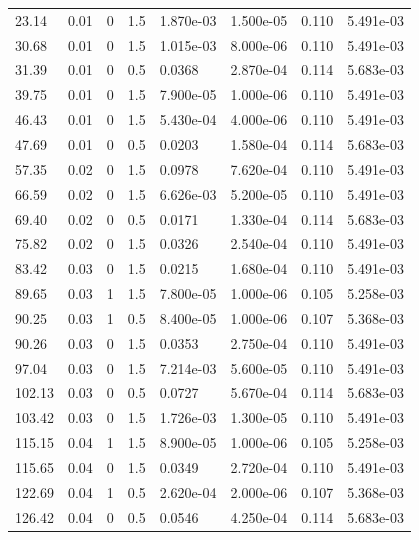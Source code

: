 \documentclass[preview]{standalone}
\begin{document}
{{\begin{tabular}{L{1.2cm}C{1.2cm} C{0.3cm}C{0.5cm} C{1.4cm}C{1.4cm} C{1.4cm}C{1.4cm}}
  23.14  &  0.01  & 0     & 1.5 &  1.870e-03  & 1.500e-05  & 0.110 &  5.491e-03   \\ 
  30.68  &  0.01  & 0     & 1.5 &  1.015e-03  & 8.000e-06  & 0.110 &  5.491e-03   \\ 
  31.39  &  0.01  & 0     & 0.5 &  0.0368  & 2.870e-04  & 0.114 &  5.683e-03   \\ 
  39.75  &  0.01  & 0     & 1.5 &  7.900e-05  & 1.000e-06  & 0.110 &  5.491e-03   \\ 
  46.43  &  0.01  & 0     & 1.5 &  5.430e-04  & 4.000e-06  & 0.110 &  5.491e-03   \\ 
  47.69  &  0.01  & 0     & 0.5 &  0.0203  & 1.580e-04  & 0.114 &  5.683e-03   \\ 
  57.35  &  0.02  & 0     & 1.5 &  0.0978  & 7.620e-04  & 0.110 &  5.491e-03   \\ 
  66.59  &  0.02  & 0     & 1.5 &  6.626e-03  & 5.200e-05  & 0.110 &  5.491e-03   \\ 
  69.40  &  0.02  & 0     & 0.5 &  0.0171  & 1.330e-04  & 0.114 &  5.683e-03   \\ 
  75.82  &  0.02  & 0     & 1.5 &  0.0326  & 2.540e-04  & 0.110 &  5.491e-03   \\ 
  83.42  &  0.03  & 0     & 1.5 &  0.0215  & 1.680e-04  & 0.110 &  5.491e-03   \\ 
  89.65  &  0.03  & 1     & 1.5 &  7.800e-05  & 1.000e-06  & 0.105 &  5.258e-03   \\ 
  90.25  &  0.03  & 1     & 0.5 &  8.400e-05  & 1.000e-06  & 0.107 &  5.368e-03   \\ 
  90.26  &  0.03  & 0     & 1.5 &  0.0353  & 2.750e-04  & 0.110 &  5.491e-03   \\ 
  97.04  &  0.03  & 0     & 1.5 &  7.214e-03  & 5.600e-05  & 0.110 &  5.491e-03   \\ 
  102.13  &  0.03  & 0     & 0.5 &  0.0727  & 5.670e-04  & 0.114 &  5.683e-03   \\ 
  103.42  &  0.03  & 0     & 1.5 &  1.726e-03  & 1.300e-05  & 0.110 &  5.491e-03   \\ 
  115.15  &  0.04  & 1     & 1.5 &  8.900e-05  & 1.000e-06  & 0.105 &  5.258e-03   \\ 
  115.65  &  0.04  & 0     & 1.5 &  0.0349  & 2.720e-04  & 0.110 &  5.491e-03   \\ 
  122.69  &  0.04  & 1     & 0.5 &  2.620e-04  & 2.000e-06  & 0.107 &  5.368e-03   \\ 
  126.42  &  0.04  & 0     & 0.5 &  0.0546  & 4.250e-04  & 0.114 &  5.683e-03   \\ 

\end{tabular}}}
\end{document}
